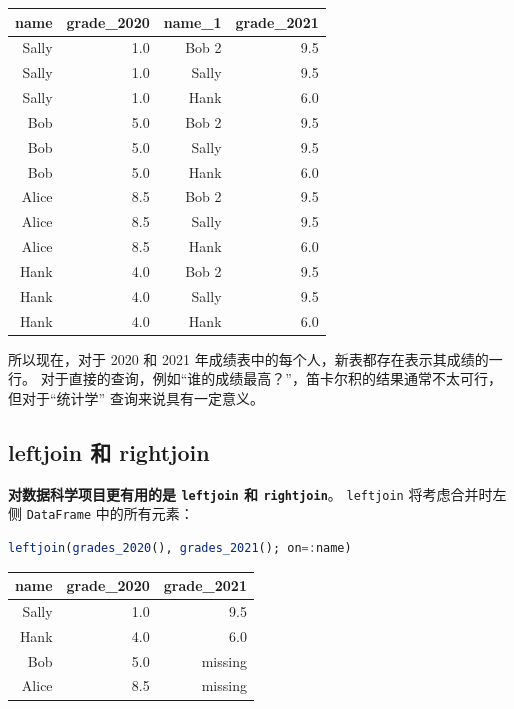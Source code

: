 \documentclass[
  notoc %
]{tufte-book}
\newcommand{\passthrough}[1]{#1}
\begin{document}
\begin{longtable}[]{@{}rrrr@{}}
\toprule
name & grade\_2020 & name\_1 & grade\_2021 \\
\midrule
\endhead
Sally & 1.0 & Bob 2 & 9.5 \\
Sally & 1.0 & Sally & 9.5 \\
Sally & 1.0 & Hank & 6.0 \\
Bob & 5.0 & Bob 2 & 9.5 \\
Bob & 5.0 & Sally & 9.5 \\
Bob & 5.0 & Hank & 6.0 \\
Alice & 8.5 & Bob 2 & 9.5 \\
Alice & 8.5 & Sally & 9.5 \\
Alice & 8.5 & Hank & 6.0 \\
Hank & 4.0 & Bob 2 & 9.5 \\
Hank & 4.0 & Sally & 9.5 \\
Hank & 4.0 & Hank & 6.0 \\
\bottomrule
\end{longtable}

所以现在，对于 2020 和 2021
年成绩表中的每个人，新表都存在表示其成绩的一行。
对于直接的查询，例如``谁的成绩最高？''，笛卡尔积的结果通常不太可行，但对于``统计学''
查询来说具有一定意义。

\hypertarget{sec:leftjoin_rightjoin}{%
\subsection{leftjoin 和 rightjoin}\label{sec:leftjoin_rightjoin}}

\textbf{对数据科学项目更有用的是 \passthrough{\lstinline!leftjoin!} 和
\passthrough{\lstinline!rightjoin!}}。
\passthrough{\lstinline!leftjoin!} 将考虑合并时左侧
\passthrough{\lstinline!DataFrame!} 中的所有元素：

\begin{lstlisting}[language=Julia]
leftjoin(grades_2020(), grades_2021(); on=:name)
\end{lstlisting}

\begin{longtable}[]{@{}rrr@{}}
\toprule
name & grade\_2020 & grade\_2021 \\
\midrule
\endhead
Sally & 1.0 & 9.5 \\
Hank & 4.0 & 6.0 \\
Bob & 5.0 & missing \\
Alice & 8.5 & missing \\
\bottomrule
\end{longtable}
\end{document}
